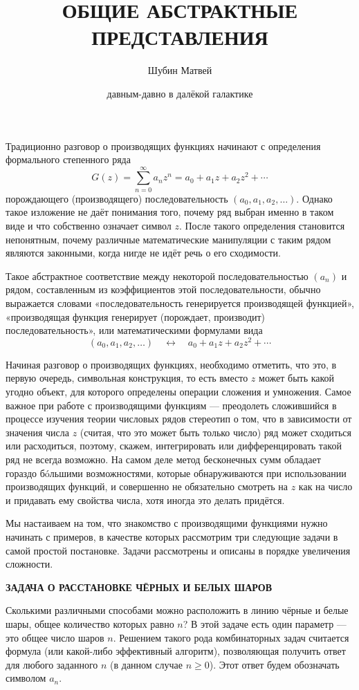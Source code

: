 \documentclass[12pt, letterpaper]{extarticle}
\title{\textbf{ОБЩИЕ АБСТРАКТНЫЕ ПРЕДСТАВЛЕНИЯ}}
\author{Шубин Матвей}
\date{давным-давно в далёкой галактике}
\begin{document}
\maketitle
Традиционно разговор о производящих функциях начинают с определения формального степенного ряда
\[G(z)=\sum_{n=0}^{\infty} a_nz^n = a_0 + a_1z + a_2z^2 + \cdots\]
порождающего (производящего) последовательность $(a_0, a_1, a_2, \dots)$. Однако такое изложение не даёт понимания того, почему ряд выбран именно в таком виде и что собственно означает символ $z$. После такого определения становится непонятным, почему различные математические манипуляции с таким рядом являются законными, когда нигде не идёт речь о его сходимости.

Такое абстрактное соответствие между некоторой последовательностью $(a_n)$ и рядом, составленным из коэффициентов этой последовательности, обычно выражается словами «последовательность генерируется производящей функцией», «производящая функция генерирует (порождает, производит) последовательность», или математическими формулами вида
\[(a_0,a_1,a_2,\ldots)\quad\leftrightarrow\quad a_0+a_1z+a_2z^2+\cdots\]

Начиная разговор о производящих функциях, необходимо отметить, что это, в первую очередь, символьная конструкция, то есть вместо $z$ может быть какой угодно объект, для которого определены операции сложения и умножения. Самое важное при работе с производящими функциям — преодолеть сложившийся в процессе изучения теории числовых рядов стереотип о том, что в зависимости от значения числа $z$ (считая, что это может быть только число) ряд может сходиться или расходиться, поэтому, скажем, интегрировать или дифференцировать такой ряд не всегда возможно. На самом деле метод бесконечных сумм обладает гораздо бóльшими возможностями, которые обнаруживаются при использовании производящих функций, и совершенно не обязательно смотреть на $z$ как на число и придавать ему свойства числа, хотя иногда это делать придётся.

Мы настаиваем на том, что знакомство с производящими функциями нужно начинать с примеров, в качестве которых рассмотрим три следующие задачи в самой простой постановке. Задачи рассмотрены и описаны в порядке увеличения сложности.

\begin{center}
  \textbf{ЗАДАЧА О РАССТАНОВКЕ ЧЁРНЫХ И БЕЛЫХ ШАРОВ}
\end{center}

Сколькими различными способами можно расположить в линию чёрные и белые шары, общее количество которых равно $n$? В этой задаче есть один параметр — это общее число шаров $n$. Решением такого рода комбинаторных задач считается формула (или какой-либо эффективный алгоритм), позволяющая получить ответ для любого заданного $n$ (в данном случае $n\geq0$). Этот ответ будем обозначать символом $a_n$.
\end{document}
